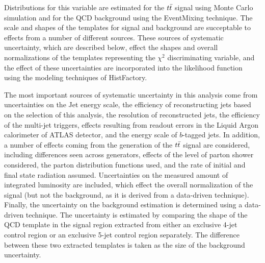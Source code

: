 Distributions for this variable are estimated for the $t\bar{t}$ signal using Monte Carlo simulation and for the QCD background using the EventMixing technique.
The scale and shapes of the templates for signal and background are succeptable to effects from a number of different sources.
These sources of systematic uncertainty, which are described below, effect the shapes and overall normalizations of the templates
representing the $\chi^2$ discriminating variable, and the effect of these uncertainties are incorporated into the likelihood
function using the modeling techniques of HistFactory.


The most important sources of systematic uncertainty in this analysis come from uncertainties on the Jet energy scale,
the efficiency of reconstructing jets based on the selection of this analysis, the resolution of reconstructed jets,
the efficiency of the multi-jet triggers, 
effects resulting from readout errors in the Liquid Argon calorimeter of ATLAS detector, 
and the energy scale of $b$-tagged jets.
In addition, a number of effects coming from the generation of the $t\bar{t}$ signal are considered, 
including differences seen across generators, effects of the level of parton shower considered, 
the parton distribution functions used,
and the rate of initial and final state radiation assumed.
Uncertainties on the measured amount of integrated luminosity are included, which effect the overall
normalization of the signal (but not the background, as it is derived from a data-driven technique).
Finally, the uncertainty on the background estimation is determined using a data-driven technique.
The uncertainty is estimated by comparing the shape of the QCD template in the signal region extracted
from either an exclusive 4-jet control region or an exclusive 5-jet control region separately.
The difference between these two extracted templates is taken as the size of the background uncertainty.


